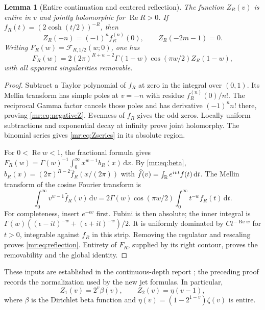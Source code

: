 \documentclass[11pt,letterpaper]{article}
\newtheorem{lemma}[theorem]{Lemma}
\theoremstyle{definition}\newtheorem{definition}[theorem]{Definition}
\theoremstyle{remark}\newtheorem{remark}[theorem]{Remark}
\newcommand{\Rea}{\operatorname{Re}}\newcommand{\Ima}{\operatorname{Im}}
\newcommand{\dd}{\,\mathrm d}\newcommand{\M}{\mathcal M}
\newcommand{\F}{\mathcal F}\newcommand{\B}{\mathcal B}
\begin{document}
\begin{lemma}[Entire continuation and centered reflection]\label{mr:lem:reflection}
The function $Z_R(v)$ is entire in $v$ and jointly holomorphic for
$\Rea R>0$. If $f_R(t)=(2\cosh(t/2))^{-R}$, then
\begin{equation}\label{mr:eq:negativeZ}
 Z_R(-n)=(-1)^n f_R^{(n)}(0),\qquad
 Z_R(-2m-1)=0.
\end{equation}
Writing $F_R(w)=\F_{R,1/2}(w;0)$, one has
\begin{equation}\label{mr:eq:reflection}
 F_R(w)=2(2\pi)^{R+w-2}\Gamma(1-w)
              \cos(\pi w/2)Z_R(1-w),
\end{equation}
with all apparent singularities removable.
\end{lemma}
\begin{proof}
Subtract a Taylor polynomial of $f_R$ at zero in the integral over
$(0,1)$. Its Mellin transform has simple poles at $v=-n$ with residue
$f_R^{(n)}(0)/n!$. The reciprocal Gamma factor cancels those poles and
has derivative $(-1)^n n!$ there, proving \eqref{mr:eq:negativeZ}.
Evenness of $f_R$ gives the odd zeros. Locally uniform subtractions and
exponential decay at infinity prove joint holomorphy. The binomial
series gives \eqref{mr:eq:Zseries} in its absolute region.

For $0<\Rea w<1$, the fractional formula gives
$F_R(w)=\Gamma(w)^{-1}\int_0^\infty x^{w-1}b_R(x)\dd x$.
By \eqref{mr:eq:beta}, $b_R(x)=(2\pi)^{R-2}\widehat f_R(x/(2\pi))$
with $\widehat f(v)=\int_\R e^{ivt}f(t)\dd t$.
The Mellin transform of the cosine Fourier transform is
\[
 \int_0^\infty v^{w-1}\widehat f_R(v)\dd v
 =2\Gamma(w)\cos(\pi w/2)\int_0^\infty t^{-w}f_R(t)\dd t.
\]
For completeness, insert $e^{-\epsilon v}$ first. Fubini is then
absolute; the inner integral is
$\Gamma(w)((\epsilon-it)^{-w}+(\epsilon+it)^{-w})/2$.
It is uniformly dominated by $Ct^{-\Rea w}$ for $t>0$, integrable
against $f_R$ in this strip. Removing the regulator and rescaling
proves \eqref{mr:eq:reflection}. Entirety of $F_R$, supplied by its
right contour, proves the removability and the global identity.
\end{proof}
These inputs are established in the continuous-depth report \cite{CDL};
the preceding proof records the normalization used by the new jet formulas.
In particular,
\begin{equation}\label{mr:eq:classicalZ}
 Z_1(v)=2^v\beta(v),\qquad Z_2(v)=\eta(v-1),
\end{equation}
where $\beta$ is the Dirichlet beta function and
$\eta(v)=(1-2^{1-v})\zeta(v)$ is entire.
\end{document}
